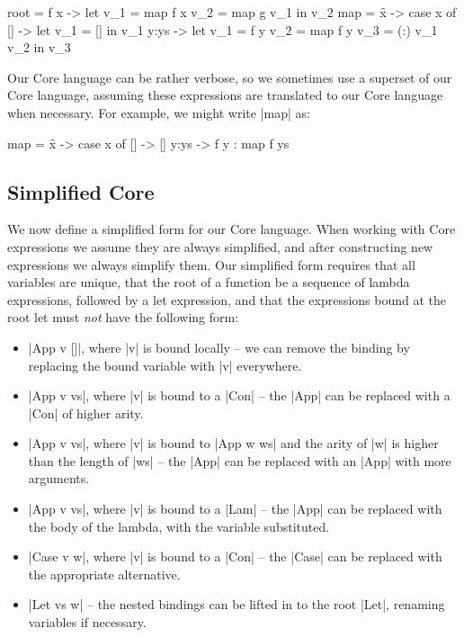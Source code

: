 \documentclass[draft]{sigplanconf}
\begin{document}
\begin{code}
root = \g f x ->  let  v_1 =  map f x
                       v_2 =  map g v_1
                  in   v_2
map = \f x -> case  x of
                    []    ->   let  v_1 = []
                               in   v_1
                    y:ys  ->   let  v_1 = f y
                                    v_2 = map f y
                                    v_3 = (:) v_1 v_2
                               in   v_3
\end{code}

Our Core language can be rather verbose, so we sometimes use a superset of our Core language, assuming these expressions are translated to our Core language when necessary. For example, we might write |map| as:

\begin{code}
map = \f x -> case  x of
                    []    -> []
                    y:ys  -> f y : map f ys
\end{code}

\subsection{Simplified Core}
\label{sec:simplify}

We now define a simplified form for our Core language. When working with Core expressions we assume they are always simplified, and after constructing new expressions we always simplify them. Our simplified form requires that all variables are unique, that the root of a function be a sequence of lambda expressions, followed by a let expression, and that the expressions bound at the root let must \textit{not} have the following form:

\begin{itemize}
\item |App v []|, where |v| is bound locally -- we can remove the binding by replacing the bound variable with |v| everywhere.
\item |App v vs|, where |v| is bound to a |Con| -- the |App| can be replaced with a |Con| of higher arity.
\item |App v vs|, where |v| is bound to |App w ws| and the arity of |w| is higher than the length of |ws| -- the |App| can be replaced with an |App| with more arguments.
\item |App v vs|, where |v| is bound to a |Lam| -- the |App| can be replaced with the body of the lambda, with the variable substituted.
\item |Case v w|, where |v| is bound to a |Con| -- the |Case| can be replaced with the appropriate alternative.
\item |Let vs w| -- the nested bindings can be lifted in to the root |Let|, renaming variables if necessary.
\end{itemize}
\end{document}
